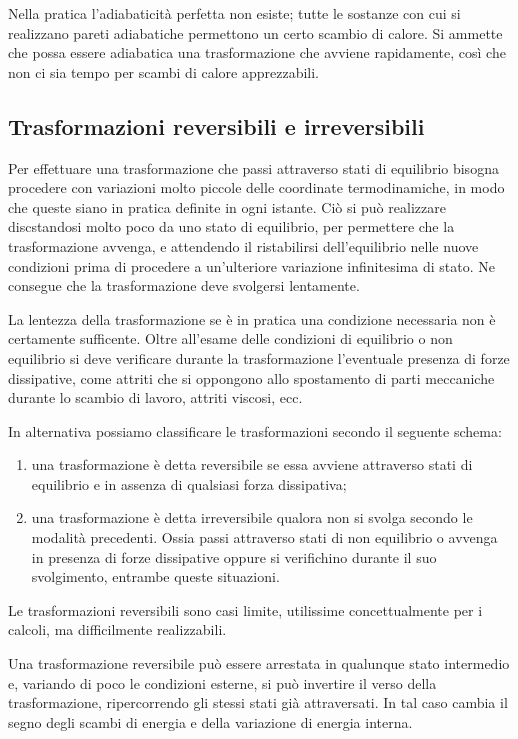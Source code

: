 \documentclass[class=book, crop=false, oneside, 12pt]{standalone}
\begin{document}
Nella pratica l'adiabaticità perfetta non esiste; tutte le sostanze con cui si realizzano pareti adiabatiche permettono un certo scambio di calore. 
Si ammette che possa essere adiabatica una trasformazione che avviene rapidamente, così che non ci sia tempo per scambi di calore apprezzabili. 

\subsection{Trasformazioni reversibili e irreversibili}

Per effettuare una trasformazione che passi attraverso stati di equilibrio bisogna procedere con variazioni molto piccole delle coordinate termodinamiche, in modo che queste siano in pratica definite in ogni istante.
Ciò si può realizzare discstandosi molto poco da uno stato di equilibrio, per permettere che la trasformazione avvenga, e attendendo il ristabilirsi dell'equilibrio nelle nuove condizioni prima di procedere a un'ulteriore variazione infinitesima di stato. 
Ne consegue che la trasformazione deve svolgersi lentamente.

La lentezza della trasformazione se è in pratica una condizione necessaria non è certamente sufficente.
Oltre all'esame delle condizioni di equilibrio o non equilibrio si deve verificare durante la trasformazione l'eventuale presenza di forze dissipative, come attriti che si oppongono allo spostamento di parti meccaniche durante lo scambio di lavoro, attriti viscosi, ecc.

In alternativa possiamo classificare le trasformazioni secondo il seguente schema:

\begin{enumerate}
    \item una trasformazione è detta reversibile se essa avviene attraverso stati di equilibrio e in assenza di qualsiasi forza dissipativa; 
    \item una trasformazione è detta irreversibile qualora non si svolga secondo le modalità precedenti.
    Ossia passi attraverso stati di non equilibrio o avvenga in presenza di forze dissipative oppure si verifichino durante il suo svolgimento, entrambe queste situazioni. 
\end{enumerate}
Le trasformazioni reversibili sono casi limite, utilissime concettualmente per i calcoli, ma difficilmente realizzabili.

Una trasformazione reversibile può essere arrestata in qualunque stato intermedio e, variando di poco le condizioni esterne, si può invertire il verso della trasformazione, ripercorrendo gli stessi stati già attraversati.  
In tal caso cambia il segno degli scambi di energia e della variazione di energia interna.
\end{document}
